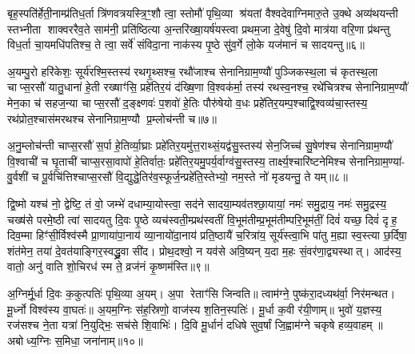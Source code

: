 बृह॒स्पति॑र्\mbox{}हेती॒नाम्प्र॑तिध॒र्ता त्रि॑णवत्रयस्त्रि॒ꣳ॒शौ त्वा॒ स्तोमौ॑ पृथि॒व्या श्र॑यतां वैश्वदेवाग्निमारु॒ते उ॒क्थे अव्य॑थयन्ती स्तभ्नीता शाक्वररैव॒ते साम॑नी॒ प्रति॑ष्ठित्या अ॒न्तरि॑ख्षा॒यर्\mbox{}ष॑यस्त्वा प्रथम॒जा दे॒वेषु॑ दि॒वो मात्र॑या वरि॒णा प्र॑थन्तु विध॒र्ता चा॒यमधि॑पतिश्च॒ ते त्वा॒ सर्वे॑ संविदा॒ना नाक॑स्य पृ॒ष्ठे सु॑व॒र्गे लो॒के यज॑मानं च सादयन्तु॥६॥

{\anuvakamend[{प्र॒तीची॒ दिङ्म॒रुत॑स्ते दे॒वा अधि॑पतयश्चत्वारि॒ꣳ॒शच्च॑॥२॥}]}

अ॒यम्पु॒रो हरि॑केशः॒ सूर्य॑रश्मि॒स्तस्य॑ रथगृ॒थ्सश्च॒ रथौ॑जाश्च सेनानिग्राम॒ण्यौ॑ पुञ्जिकस्थ॒ला च॑ कृतस्थ॒ला चाप्स॒रसौ॑ यातु॒धाना॑ हे॒ती रख्षाꣳ॑सि॒ प्रहे॑तिर॒यं द॑ख्षि॒णा वि॒श्वक॑र्मा॒ तस्य॑ रथस्व॒नश्च॒ रथे॑चित्रश्च सेनानिग्राम॒ण्यौ॑ मेन॒का च॑ सहज॒न्या चाप्स॒रसौ॑ द॒ङ्क्ष्णवः॑ प॒शवो॑ हे॒तिः पौरु॑षेयो व॒धः प्रहे॑तिर॒यम्प॒श्चाद्वि॒श्वव्य॑चा॒स्तस्य॒ रथ॑प्रोत॒श्चास॑मरथश्च सेनानिग्राम॒ण्यौ प्र॒म्लोच॑न्ती च॥७॥

अ॒नु॒म्लोच॑न्ती चाप्स॒रसौ॑ स॒र्पा हे॒तिर्व्या॒घ्राः प्रहे॑तिर॒यमु॑त्त॒राथ्सं॒यद्व॑सु॒स्तस्य॑ सेन॒जिच्च॑ सु॒षेण॑श्च सेनानिग्राम॒ण्यौ॑ वि॒श्वाची॑ च घृ॒ताची॑ चाप्स॒रसा॒वापो॑ हे॒तिर्वातः॒ प्रहे॑तिर॒यमु॒पर्य॒र्वाग्व॑सु॒स्तस्य॒ तार्क्ष्य॒श्चारि॑ष्टनेमिश्च सेनानिग्राम॒ण्या॑- वु॒र्वशी॑ च पू॒र्वचि॑त्तिश्चाप्स॒रसौ॑ वि॒द्युद्धे॒तिर॑व॒स्फूर्ज॒न्प्रहे॑ति॒स्तेभ्यो॒ नम॒स्ते नो॑ मृडयन्तु॒ ते यम्॥८॥

द्वि॒ष्मो यश्च॑ नो॒ द्वेष्टि॒ तं वो॒ जम्भे॑ दधाम्या॒योस्त्वा॒ सद॑ने सादया॒म्यव॑तश्छा॒यायां॒ नमः॑ समु॒द्राय॒ नमः॑ समु॒द्रस्य॒ चख्ष॑से परमे॒ष्ठी त्वा॑ सादयतु दि॒वः पृ॒ष्ठे व्यच॑स्वती॒म्प्रथ॑स्वतीं वि॒भूम॑तीम्प्र॒भूम॑तीम्परि॒भूम॑तीं॒ दिवं॑ यच्छ॒ दिवं॑ दृह॒ दिव॒म्मा हिꣳ॑सी॒र्विश्व॑स्मै प्रा॒णाया॑पा॒नाय॑ व्या॒नायो॑दा॒नाय॑ प्रति॒ष्ठायै॑ च॒रित्रा॑य॒ सूर्य॑स्त्वा॒भि पा॑तु म॒ह्या स्व॒स्त्या छ॒र्दिषा॒ शंत॑मेन॒ तया॑ दे॒वत॑याङ्गिर॒स्वद्ध्रु॒वा सी॑द। प्रोथ॒दश्वो॒ न यव॑से अवि॒ष्यन् य॒दा म॒हः सं॒वर॑णा॒द्व्यस्थात्। आद॑स्य॒ वातो॒ अनु॑ वाति शो॒चिरध॑ स्म ते॒ व्रज॑नं कृ॒ष्णम॑स्ति॥९॥

{\anuvakamend[{प्र॒म्लोच॑न्ती च॒ य स्व॒स्त्याष्टाविꣳ॑शतिश्च॥३॥}]}

अ॒ग्निर्मू॒र्धा दि॒वः क॒कुत्पतिः॑ पृथि॒व्या अ॒यम्। अ॒पा रेताꣳ॑सि जिन्वति॥ त्वाम॑ग्ने॒ पुष्क॑रा॒दध्यथ॑र्वा॒ निर॑मन्थत। मू॒र्ध्नो विश्व॑स्य वा॒घतः॑॥ अ॒यम॒ग्निः स॑ह॒स्रिणो॒ वाज॑स्य श॒तिन॒स्पतिः॑। मू॒र्धा क॒वी र॑यी॒णाम्॥ भुवो॑ य॒ज्ञस्य॒ रज॑सश्च ने॒ता यत्रा॑ नि॒युद्भिः॒ सच॑से शि॒वाभिः॑। दि॒वि मू॒र्धानं॑ दधिषे सुव॒र्\mbox{}षां जि॒ह्वाम॑ग्ने चकृषे हव्य॒वाहम्॥ अबोध्य॒ग्निः स॒मिधा॒ जना॑नाम्॥१०॥

